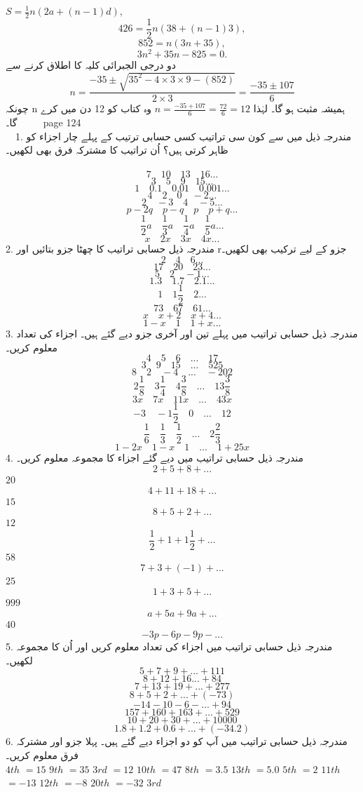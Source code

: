 \(S=\frac{1}{2}n(2a+(n-1)d),\)
\[426=\frac{1}{2}n(38+(n-1)3),\]
\[852=n(3n+35),\]
\[3n^{2}+35n-825=0.\]
دو درجی الجبرائی کلیہ کا اطلاق کرنے سے
\[n=\frac{-35\pm\sqrt{35^{2}-4\times3\times9-(852)}}{2\times3}=\frac{-35\pm107}{6}\]
چونکہ n ہمیشہ مثبت ہو گا۔ لہٰذا
\(n=\frac{-35+107}{6}=\frac{72}{6}=12\)
وہ کتاب کو 12 دن میں کرے گا۔
 \clearpage
 page 124\\
 1.	مندرجہ ذیل میں سے کون سی تراتیب کسی حسابی ترتیب کے پہلے چار اجزاء کو ظاہر کرتی ہیں؟ اُن تراتیب کا مشترکہ فرق بھی لکھیں۔\\
 \[7\quad10\quad13\quad16...\]
\[3\quad5\quad9\quad15...\]
\[1\quad0.1\quad0.01\quad0.001...\]
\[4\quad2\quad0\quad-2...\]
\[2\quad-3\quad4\quad-5...\]
\[p-2q\quad p-q\quad p\quad p+q...\]
\[\frac{1}{2}a\quad \frac{1}{3}a\quad \frac{1}{4}a\quad \frac{1}{5}a...\]
\[x\quad2x\quad3x\quad4x...\]
2.	مندرجہ ذیل حسابی تراتیب کا چھٹا جزو بتائیں اور rجزو کے لیے ترکیب بھی لکھیں۔\\
\[2\quad4\quad6...\]
\[17\quad20\quad23...\]
\[5\quad2\quad-1...\]
\[1.3\quad1.7\quad2.1...\]
\[1\quad1\frac{1}{2}\quad2...\]
\[73\quad67\quad61...\]
\[x\quad x+2\quad x+4...\]
\[1-x\quad1\quad1+x...\]
3.	مندرجہ ذیل حسابی تراتیب میں پہلے تین اور آخری جزو دیے گئے ہیں۔ اجزاء کی تعداد معلوم کریں۔\\
\[4\quad5\quad6\quad...\quad17\]
\[3\quad9\quad15\quad...\quad525\]
\[8\quad2\quad-4\quad...\quad-202\]
\[2\frac{1}{8}\quad3\frac{1}{4}\quad4\frac{3}{8}\quad...\quad13\frac{3}{8}\]
\[3x\quad7x\quad11x\quad...\quad43x\]
\[-3\quad-1\frac{1}{2}\quad0\quad...\quad12\]
\[\frac{1}{6}\quad\frac{1}{3}\quad\frac{1}{2}\quad...\quad2\frac{2}{3}\]
\[1-2x\quad1-x\quad1\quad...\quad1+25x\]
4.	مندرجہ ذیل حسابی تراتیب میں دیے گئے اجزاء کا مجموعہ معلوم کریں۔\\
\[2+5+8+...\]
\(20\)
\[4+11+18+...\]
\(15\)
\[8+5+2+...\]
\(12\)
\[\frac{1}{2}+1+1\frac{1}{2}+...\]
\(58\)
\[7+3+(-1)+...\]
\(25\)
\[1+3+5+...\]
\(999\)
\[a+5a+9a+...\]
\(40\)
\[-3p-6p-9p-...\]
5.	مندرجہ ذیل حسابی تراتیب میں اجزاء کی تعداد معلوم کریں اور اُن کا مجموعہ لکھیں۔\\
\[5+7+9+...+111\]
\[8+12+16...+84\]
\[7+13+19+...+277\]
\[8+5+2+...+(-73)\]
\[-14-10-6-...+94\]
\[157+160+163+...+529\]
\[10+20+30+...+10000\]
\[1.8+1.2+0.6+...+(-34.2)\]
6.	مندرجہ ذیل حسابی تراتیب میں آپ کو دو اجزاء دیے گئے ہیں۔ پہلا جزو اور مشترکہ فرق معلوم کریں۔\\
\(4th\)
\(=15\)
\(9th\)
\(=35\)
\(3rd\)
\(=12\)
\(10th\)
\(=47\)
\(8th\)
\(=3.5\)
\(13th\)
\(=5.0\)
\(5th\)
\(=2\)
\(11th\)
\(=-13\)
\(12th\)
\(=-8\)
\(20th\)
\(=-32\)
\(3rd\)
